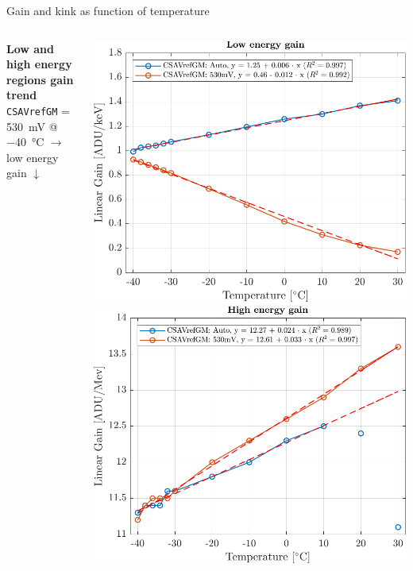 \documentclass[aspectratio=169,xcolor=dvipsnames,handout]{beamer} %
\begin{document}
\begin{frame}{Gain and kink as function of temperature}
\begin{columns}
            \textbf{Low and high energy regions gain trend}\\
            \vspace{0.2cm}
            \texttt{CSAVrefGM} = \SI{530}{\milli\volt} @ \SI{-40}{\celsius} $\rightarrow$ low energy gain $\downarrow$
            \vspace{-0.2cm}
            \begin{center}
                \includegraphics[height=0.32\textheight]{images/temperature_effects/low_energy_gain_auto_530mV.pdf}
                \includegraphics[height=0.32\textheight]{images/temperature_effects/high_energy_gain_auto_530mV.pdf}
            \end{center}


\end{columns}
\end{frame}
\end{document}
